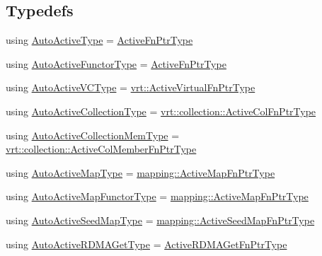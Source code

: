 \subsection*{Typedefs}
\begin{DoxyCompactItemize}
\item 
using \hyperlink{namespacevt_1_1auto__registry_adc4d91d5c7fe1b7d36f2c490ae14c9ac}{Auto\+Active\+Type} = \hyperlink{namespacevt_a70e19bd64d031e65083c2125b2c65426}{Active\+Fn\+Ptr\+Type}
\item 
using \hyperlink{namespacevt_1_1auto__registry_a0efe8e4e502d6a88a8eb50d7d909228d}{Auto\+Active\+Functor\+Type} = \hyperlink{namespacevt_a70e19bd64d031e65083c2125b2c65426}{Active\+Fn\+Ptr\+Type}
\item 
using \hyperlink{namespacevt_1_1auto__registry_a4a96fdbb11b7be748365fcfc6fc46862}{Auto\+Active\+V\+C\+Type} = \hyperlink{namespacevt_1_1vrt_a53c67fe3c204169d703b59fc9fd3f06c}{vrt\+::\+Active\+Virtual\+Fn\+Ptr\+Type}
\item 
using \hyperlink{namespacevt_1_1auto__registry_a3a45df4bb1c58e5178e3c0cf349baea4}{Auto\+Active\+Collection\+Type} = \hyperlink{namespacevt_1_1vrt_1_1collection_ab2e800e37837a2afe33996fe8f5fabea}{vrt\+::collection\+::\+Active\+Col\+Fn\+Ptr\+Type}
\item 
using \hyperlink{namespacevt_1_1auto__registry_aa217123c03472f9bcee51300d638b16e}{Auto\+Active\+Collection\+Mem\+Type} = \hyperlink{namespacevt_1_1vrt_1_1collection_aa4614a0de67301c62259b0763a86f473}{vrt\+::collection\+::\+Active\+Col\+Member\+Fn\+Ptr\+Type}
\item 
using \hyperlink{namespacevt_1_1auto__registry_a03898a246ff1a8ce8ee4071a0391b386}{Auto\+Active\+Map\+Type} = \hyperlink{namespacevt_1_1mapping_a748d5efb71ca5878288d5809f57d7254}{mapping\+::\+Active\+Map\+Fn\+Ptr\+Type}
\item 
using \hyperlink{namespacevt_1_1auto__registry_ab095554f67e143f84fe337bd85affde5}{Auto\+Active\+Map\+Functor\+Type} = \hyperlink{namespacevt_1_1mapping_a748d5efb71ca5878288d5809f57d7254}{mapping\+::\+Active\+Map\+Fn\+Ptr\+Type}
\item 
using \hyperlink{namespacevt_1_1auto__registry_a9b5f3bdf0a9a503806cfd4f2747c82f6}{Auto\+Active\+Seed\+Map\+Type} = \hyperlink{namespacevt_1_1mapping_a254b50d55be91c3bd002481b2e96da7e}{mapping\+::\+Active\+Seed\+Map\+Fn\+Ptr\+Type}
\item 
using \hyperlink{namespacevt_1_1auto__registry_a039813f93a5804c77ae612e0318fb335}{Auto\+Active\+R\+D\+M\+A\+Get\+Type} = \hyperlink{namespacevt_ae4fbf97da623bfcd09ee8379de756257}{Active\+R\+D\+M\+A\+Get\+Fn\+Ptr\+Type}

\end{DoxyCompactItemize}
